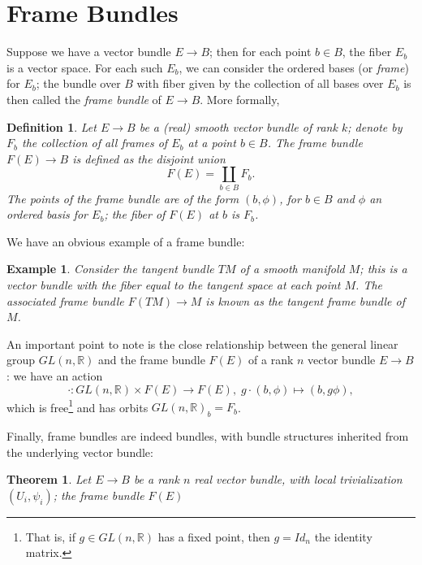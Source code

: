 \documentclass{tufte-handout}
\newtheorem{thrm}{Theorem} %
\newtheorem{example}{Example} %
\newtheorem{defn}{Definition} %
\begin{document}
\section{Frame Bundles}
Suppose we have a vector bundle $E \to B$; then for each point $b \in B$, the fiber $E_b$ is a vector space. For each such $E_b$, we can consider the ordered bases (or \emph{frame}) for $E_b$; the bundle over $B$ with fiber given by the collection of all bases over $E_b$ is then called the \emph{frame bundle} of $E \to B$. More formally,
\begin{fullwidth}
\begin{defn}
Let $E \to B$ be a (real) smooth vector bundle of rank $k$; denote by $F_b$ the collection of all frames of $E_b$ at a point $b \in B$. The \emph{frame bundle} $F(E) \to B$ is defined as the disjoint union
$$
F(E) = \coprod_{b \in B} F_b.
$$
The points of the frame bundle are of the form $(b,\phi)$, for $b \in B$ and $\phi$ an ordered basis for $E_b$; the fiber of $F(E)$ at $b$ is $F_b$.
\end{defn}
\end{fullwidth}
We have an obvious example of a frame bundle:
\begin{fullwidth}
\begin{example}
\item Consider the tangent bundle $TM$ of a smooth manifold $M$; this is a vector bundle with the fiber equal to the tangent space at each point $M$. The associated frame bundle $F(TM) \to M$ is known as the \emph{tangent frame bundle} of $M$.
\end{example}
\end{fullwidth}

An important point to note is the close relationship between the general linear group $GL(n,\mathbb{R})$ and the frame bundle $F(E)$ of a rank $n$ vector bundle $E \to B$: we have an action
$$
\cdot : GL(n,\mathbb{R}) \times F(E) \to F(E), \; g \cdot (b,\phi) \mapsto (b,g\phi),
$$
which is free\footnote{That is, if $g \in GL(n,\mathbb{R})$ has a fixed point, then $g = Id_n$ the identity matrix.} and has orbits $GL(n,\mathbb{R})_b = F_b$.

Finally, frame bundles are indeed bundles, with bundle structures inherited from the underlying vector bundle:
\begin{fullwidth}
\begin{thrm}
Let $E \to B$ be a rank $n$ real vector bundle, with local trivialization $(U_i, \psi_i)$; the frame bundle $F(E)$ %
\end{thrm}
\end{fullwidth}
\end{document}
